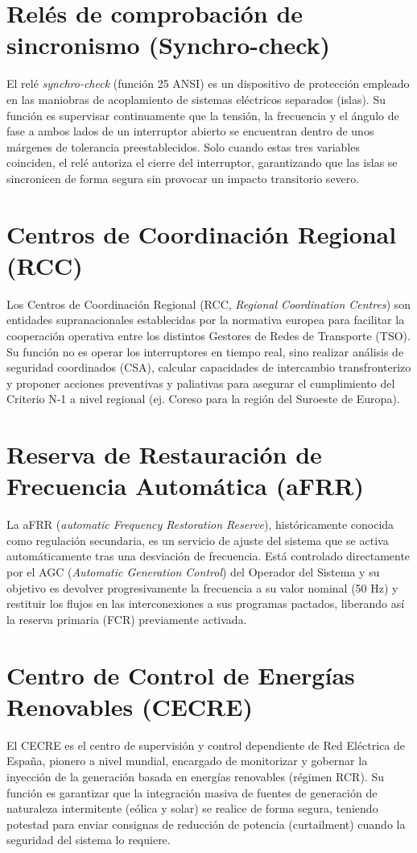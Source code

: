 \section{Relés de comprobación de sincronismo (Synchro-check)}
\label{anexo:synchro_check}
El relé \textit{synchro-check} (función 25 ANSI) es un dispositivo de protección empleado en las maniobras de acoplamiento de sistemas eléctricos separados (islas). Su función es supervisar continuamente que la tensión, la frecuencia y el ángulo de fase a ambos lados de un interruptor abierto se encuentran dentro de unos márgenes de tolerancia preestablecidos. Solo cuando estas tres variables coinciden, el relé autoriza el cierre del interruptor, garantizando que las islas se sincronicen de forma segura sin provocar un impacto transitorio severo.

\section{Centros de Coordinación Regional (RCC)}
\label{anexo:rcc}
Los Centros de Coordinación Regional (RCC, \textit{Regional Coordination Centres}) son entidades supranacionales establecidas por la normativa europea para facilitar la cooperación operativa entre los distintos Gestores de Redes de Transporte (TSO). Su función no es operar los interruptores en tiempo real, sino realizar análisis de seguridad coordinados (CSA), calcular capacidades de intercambio transfronterizo y proponer acciones preventivas y paliativas para asegurar el cumplimiento del Criterio N-1 a nivel regional (ej. Coreso para la región del Suroeste de Europa).

\section{Reserva de Restauración de Frecuencia Automática (aFRR)}
\label{anexo:afrr}
La aFRR (\textit{automatic Frequency Restoration Reserve}), históricamente conocida como regulación secundaria, es un servicio de ajuste del sistema que se activa automáticamente tras una desviación de frecuencia. Está controlado directamente por el AGC (\textit{Automatic Generation Control}) del Operador del Sistema y su objetivo es devolver progresivamente la frecuencia a su valor nominal (50 Hz) y restituir los flujos en las interconexiones a sus programas pactados, liberando así la reserva primaria (FCR) previamente activada.

\section{Centro de Control de Energías Renovables (CECRE)}
\label{anexo:cecre}
El CECRE es el centro de supervisión y control dependiente de Red Eléctrica de España, pionero a nivel mundial, encargado de monitorizar y gobernar la inyección de la generación basada en energías renovables (régimen RCR). Su función es garantizar que la integración masiva de fuentes de generación de naturaleza intermitente (eólica y solar) se realice de forma segura, teniendo potestad para enviar consignas de reducción de potencia (curtailment) cuando la seguridad del sistema lo requiere.